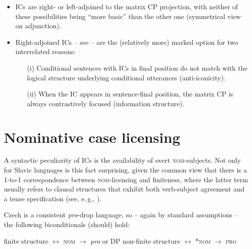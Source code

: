 \documentclass[output=paper,colorlinks,citecolor=brown,
modfonts,newtxmath
]{langscibook}
\begin{document}
\begin{itemize}

\item ICs are right- or left-adjoined to the matrix CP projection, with neither of these possibilities being ``more basic'' than the other one (symmetrical view on adjunction).

\item Right-adjoined ICs -- see  -- are the (relatively more) marked option for two interrelated reasons: 

	\begin{itemize}
	
	\item[(i)] Conditional sentences with ICs in final position do not match with the logical structure underlying conditional utterances (anti-iconicity). 
	
	\item[(ii)] When the IC appears in sentence-final position, the matrix CP is always contrastively focused (information structure).

	\end{itemize}

\end{itemize}


\section{Nominative case licensing}\label{sec:nom}

A syntactic peculiarity of ICs is the availability of overt \textsc{nom}-subjects. Not only for Slavic languages is this fact surprising, given the common view that there is a 1-to-1 correspondence between \textsc{nom}-licensing and finiteness, where the latter term usually refers to clausal structures that exhibit both verb-subject agreement and a tense specification (see, e.\,g., \citealt[4]{Cowper2002}).

Czech is a consistent \textit{pro}-drop language, so -- again by standard assumptions -- the following biconditionals (should) hold:

\ea\label{ex:finiteness}
\ea finite structure $\leftrightarrow$ \textsc{nom} \hfill $\rightarrow$ \textit{pro} or DP
\ex non-finite structure $\leftrightarrow$ \textsc{*nom} \hfill $\rightarrow$ \textsc{pro}
\z
\z
\end{document}
